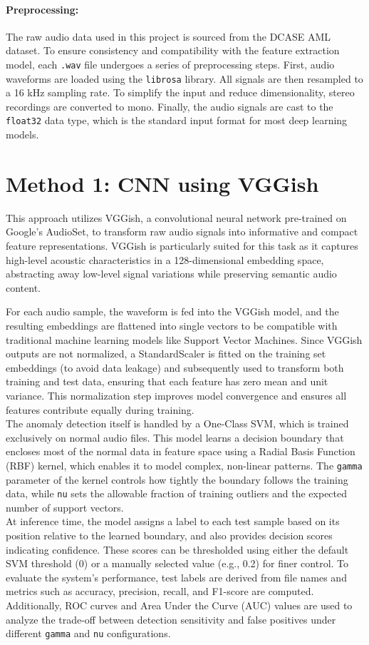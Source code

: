 \documentclass[ngerman]{scrartcl}
\begin{document}
\paragraph{Preprocessing:}
The raw audio data used in this project is sourced from the DCASE AML dataset. To ensure consistency and compatibility with the feature extraction model, each \texttt{.wav} file undergoes a series of preprocessing steps. First, audio waveforms are loaded using the \texttt{librosa} library. All signals are then resampled to a 16 kHz sampling rate. To simplify the input and reduce dimensionality, stereo recordings are converted to mono. Finally, the audio signals are cast to the \texttt{float32} data type, which is the standard input format for most deep learning models.

\section*{Method 1: CNN using VGGish}
This approach utilizes VGGish, a convolutional neural network pre-trained on Google’s AudioSet, to transform raw audio signals into informative and compact feature representations. VGGish is particularly suited for this task as it captures high-level acoustic characteristics in a 128-dimensional embedding space, abstracting away low-level signal variations while preserving semantic audio content.

For each audio sample, the waveform is fed into the VGGish model, and the resulting embeddings are flattened into single vectors to be compatible with traditional machine learning models like Support Vector Machines. Since VGGish outputs are not normalized, a StandardScaler is fitted on the training set embeddings (to avoid data leakage) and subsequently used to transform both training and test data, ensuring that each feature has zero mean and unit variance. This normalization step improves model convergence and ensures all features contribute equally during training.\\
The anomaly detection itself is handled by a One-Class SVM, which is trained exclusively on normal audio files. This model learns a decision boundary that encloses most of the normal data in feature space using a Radial Basis Function (RBF) kernel, which enables it to model complex, non-linear patterns. The \texttt{gamma} parameter of the kernel controls how tightly the boundary follows the training data, while \texttt{nu} sets the allowable fraction of training outliers and the expected number of support vectors.\\
At inference time, the model assigns a label to each test sample based on its position relative to the learned boundary, and also provides decision scores indicating confidence. These scores can be thresholded using either the default SVM threshold (0) or a manually selected value (e.g., 0.2) for finer control. To evaluate the system’s performance, test labels are derived from file names and metrics such as accuracy, precision, recall, and F1-score are computed. Additionally, ROC curves and Area Under the Curve (AUC) values are used to analyze the trade-off between detection sensitivity and false positives under different \texttt{gamma} and \texttt{nu} configurations.
\end{document}
